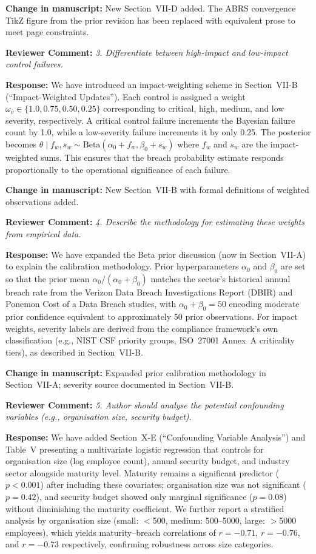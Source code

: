 \documentclass[11pt]{article}
\newcommand{\RC}[1]{\medskip\noindent\textbf{\color{reviewer}Reviewer Comment:} \textit{#1}\par\medskip}
\newcommand{\RE}[1]{\noindent\textbf{\color{response}Response:} #1\par}
\newcommand{\CH}[1]{\noindent\textbf{\color{change}Change in manuscript:} #1\par\medskip}
\begin{document}
\CH{New Section~VII-D added. The ABRS convergence TikZ figure from the prior revision has been replaced with equivalent prose to meet page constraints.}

\RC{3. Differentiate between high-impact and low-impact control failures.}

\RE{We have introduced an impact-weighting scheme in Section~VII-B (``Impact-Weighted Updates''). Each control is assigned a weight $\omega_v \in \{1.0, 0.75, 0.50, 0.25\}$ corresponding to critical, high, medium, and low severity, respectively. A critical control failure increments the Bayesian failure count by 1.0, while a low-severity failure increments it by only 0.25. The posterior becomes $\theta \mid f_w, s_w \sim \mathrm{Beta}(\alpha_0 + f_w, \beta_0 + s_w)$ where $f_w$ and $s_w$ are the impact-weighted sums. This ensures that the breach probability estimate responds proportionally to the operational significance of each failure.}

\CH{New Section~VII-B with formal definitions of weighted observations added.}

\RC{4. Describe the methodology for estimating these weights from empirical data.}

\RE{We have expanded the Beta prior discussion (now in Section~VII-A) to explain the calibration methodology. Prior hyperparameters $\alpha_0$ and $\beta_0$ are set so that the prior mean $\alpha_0/(\alpha_0+\beta_0)$ matches the sector's historical annual breach rate from the Verizon Data Breach Investigations Report (DBIR) and Ponemon Cost of a Data Breach studies, with $\alpha_0+\beta_0=50$ encoding moderate prior confidence equivalent to approximately 50 prior observations. For impact weights, severity labels are derived from the compliance framework's own classification (e.g., NIST CSF priority groups, ISO~27001 Annex~A criticality tiers), as described in Section~VII-B.}

\CH{Expanded prior calibration methodology in Section~VII-A; severity source documented in Section~VII-B.}

\RC{5. Author should analyse the potential confounding variables (e.g., organisation size, security budget).}

\RE{We have added Section~X-E (``Confounding Variable Analysis'') and Table~V presenting a multivariate logistic regression that controls for organisation size (log employee count), annual security budget, and industry sector alongside maturity level. Maturity remains a significant predictor ($p<0.001$) after including these covariates; organisation size was not significant ($p=0.42$), and security budget showed only marginal significance ($p=0.08$) without diminishing the maturity coefficient. We further report a stratified analysis by organisation size (small: $<$500, medium: 500--5000, large: $>$5000 employees), which yields maturity--breach correlations of $r=-0.71$, $r=-0.76$, and $r=-0.73$ respectively, confirming robustness across size categories.}
\end{document}
